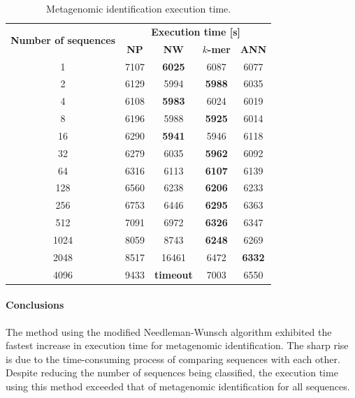 \documentclass[pdflatex,sn-vancouver-num]{sn-jnl}%
\begin{document}
                \begin{table}\centering
                    \caption{Metagenomic identification execution time.}\label{Table:Experiment:Duration}
                    \begin{tabular}{|c||c|c|c|c|}
                        \hline
                        \multirow{2}{*}{\textbf{Number of sequences}} & \multicolumn{4}{|c|}{\textbf{Execution time [s]}} \\
                                        & \textbf{NP} & \textbf{NW} & \textbf{$k$-mer} & \textbf{ANN} \\ \hline \hline
                                        1 & 7107 & \textbf{6025} & 6087 & 6077\\ \hline
                                        2 & 6129 & 5994 & \textbf{5988} & 6035\\ \hline
                                        4 & 6108 & \textbf{5983} & 6024 & 6019\\ \hline
                                        8 & 6196 & 5988 & \textbf{5925} & 6014\\ \hline
                                        16 & 6290 & \textbf{5941} & 5946 & 6118\\ \hline
                                        32 & 6279 & 6035 & \textbf{5962} & 6092\\ \hline
                                        64 & 6316 & 6113 & \textbf{6107} & 6139\\ \hline
                                        128 & 6560 & 6238 & \textbf{6206} & 6233\\ \hline
                                        256 & 6753 & 6446 & \textbf{6295} & 6363\\ \hline
                                        512 & 7091 & 6972 & \textbf{6326} & 6347\\ \hline
                                        1024 & 8059 & 8743 & \textbf{6248} & 6269\\ \hline
                                        2048 & 8517 & 16461 & 6472 & \textbf{6332}\\ \hline
                                        4096 & 9433 & \textbf{timeout} & 7003 & 6550\\ \hline

                    \end{tabular}
                \end{table}

                \paragraph{Conclusions}
                The method using the modified Needleman-Wunsch algorithm exhibited the fastest increase in execution time for metagenomic identification. The sharp rise is due to the time-consuming process of comparing sequences with each other. Despite reducing the number of sequences being classified, the execution time using this method exceeded that of metagenomic identification for all sequences.
\end{document}
